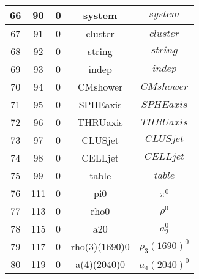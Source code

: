 \documentclass{article}
\begin{document}
\begin{table}[!htbp]
\begin{tabular}{|c|c|c|c|c|}
66 & 90 & 0 & system & $system$ \\
\hline
67 & 91 & 0 & cluster & $cluster$ \\
\hline
68 & 92 & 0 & string & $string$ \\
\hline
69 & 93 & 0 & indep & $indep$ \\
\hline
70 & 94 & 0 & CMshower & $CMshower$ \\
\hline
71 & 95 & 0 & SPHEaxis & $SPHEaxis$ \\
\hline
72 & 96 & 0 & THRUaxis & $THRUaxis$ \\
\hline
73 & 97 & 0 & CLUSjet & $CLUSjet$ \\
\hline
74 & 98 & 0 & CELLjet & $CELLjet$ \\
\hline
75 & 99 & 0 & table & $table$ \\
\hline
76 & 111 & 0 & pi0 & $\pi^{0}$ \\
\hline
77 & 113 & 0 & rho0 & $\rho^{0}$ \\
\hline
78 & 115 & 0 & a\underline{\hspace{0.6em}}20 & $a_{2}^{0}$ \\
\hline
79 & 117 & 0 & rho(3)(1690)0 & $\rho_{3}(1690)^{0}$ \\
\hline
80 & 119 & 0 & a(4)(2040)0 & $a_{4}(2040)^{0}$ \\
\hline
\end{tabular}
\end{table}

\clearpage
\end{document}
